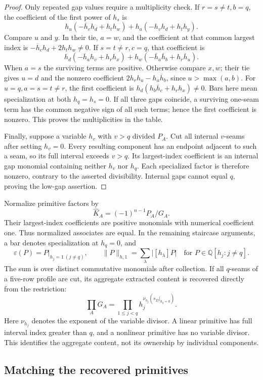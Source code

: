 \documentclass[11pt,a4paper]{amsart}
\numberwithin{equation}{section}
\theoremstyle{plain}
\theoremstyle{definition}
\newcommand{\Q}{\mathbb Q}
\begin{document}
\begin{proof}
Only repeated gap values require a multiplicity check.  If
\(r=s\ne t,b=q\), the coefficient of the first power of \(h_s\) is
\[
 h_u(-\overline h_ch_d+h_th_w)
 +h_a(-h_vh_d+h_th_y).
\]
Compare \(u\) and \(y\).  In their tie, \(a=w\), and the coefficient
at that common largest index is
\(-\overline h_ch_d+2h_th_w\ne0\).
If \(s=t\ne r,c=q\), that coefficient is
\[
 h_d(-\overline h_ah_v+h_rh_x)
 +h_w(-\overline h_a\overline h_b+h_r\overline h_u).
\]
When \(a=s\) the surviving terms are positive.  Otherwise compare
\(x,w\); their tie gives \(u=d\) and the nonzero coefficient
\(2h_rh_u-h_a\overline h_b\), since \(u>\max(a,b)\).
For \(u=q,a=s=t\ne r\), the first coefficient is
\(h_d(h_b\overline h_c+h_rh_x)\ne0\).
Bars here mean specialization at both \(h_q=h_s=0\).
If all three gaps coincide, a surviving one-seam term has the common
negative sign of all such terms; hence the first coefficient is nonzero.
This proves the multiplicities in the table.

Finally, suppose a variable \(h_v\) with \(v>q\) divided \(P_A\).
Cut all internal \(v\)-seams after setting \(h_v=0\).  Every resulting
component has an endpoint adjacent to such a seam, so its full interval
exceeds \(v>q\).  Its largest-index coefficient is an internal gap
monomial containing neither \(h_v\) nor \(h_q\).  Each specialized
factor is therefore nonzero, contrary to the asserted divisibility.
Internal gaps cannot equal \(q\), proving the low-gap assertion.
\end{proof}

Normalize primitive factors by
\[
 \widehat K_A=(-1)^{n-1}P_A/G_A.
\]
Their largest-index coefficients are positive monomials with numerical
coefficient one.  Thus normalized associates are equal.  In the remaining
staircase arguments, a bar denotes specialization at \(h_q=0\), and
\[
 \varepsilon(P)=P\big|_{h_j=1\ (j\ne q)},\qquad
 \|P\|_{h,1}=\sum_\lambda\bigl|[h_\lambda]P\bigr|
 \quad\text{for }P\in\Q[h_j:j\ne q].
\]
The sum is over distinct commutative monomials after collection.
If all \(q\)-seams of a five-row profile are cut, its aggregate
extracted content is recovered directly from the restriction:
\[
 \prod_A G_A=
 \prod_{1\le j<q}h_j^{\nu_{h_j}(s_D|_{h_q=0})}.
\]
Here \(\nu_{h_j}\) denotes the exponent of the variable divisor.  A linear
primitive has full interval index greater than \(q\),
and a nonlinear primitive has no variable divisor.  This identifies the
aggregate content, not its ownership by individual components.

\subsection{Matching the recovered primitives}
\end{document}
